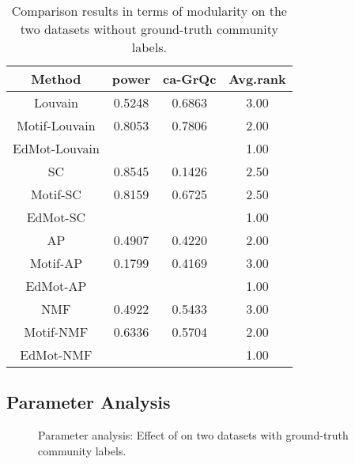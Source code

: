 \documentclass[sigconf]{acmart}
\begin{document}
\begin{table}[!t]
\caption{Comparison results in terms of modularity on the two datasets without ground-truth community labels.}
\label{table:modularity2}
\begin{center}
\vskip -0.1in
\begin{tabular}{@{}c|c|c|c@{}}
  \hline
Method  &power &ca-GrQc&Avg.rank\\
\hline
  Louvain  &0.5248\scriptsize{} & 0.6863\scriptsize{} &3.00\\
  Motif-Louvain &0.8053\scriptsize{} &0.7806\scriptsize{} &2.00\\
  EdMot-Louvain  &\scriptsize{} & \scriptsize{} &1.00\\
  \hline
  SC & 0.8545\scriptsize{}& 0.1426\scriptsize{} &2.50\\
  Motif-SC &0.8159\scriptsize{} &0.6725\scriptsize{} &2.50\\
  EdMot-SC & \scriptsize{} & \scriptsize{}&1.00 \\
  \hline
  AP  & 0.4907\scriptsize{}  &0.4220\scriptsize{} &2.00\\
  Motif-AP & 0.1799\scriptsize{}     &0.4169\scriptsize{}&3.00\\
  EdMot-AP & \scriptsize{}    &\scriptsize{} &1.00\\
  \hline
  NMF  & 0.4922\scriptsize{}    & 0.5433\scriptsize{} &3.00\\
  Motif-NMF & 0.6336\scriptsize{}    &0.5704\scriptsize{} &2.00\\
  EdMot-NMF & \scriptsize{}    & \scriptsize{} &1.00\\
  \hline
\end{tabular}
\end{center}
\end{table}














\subsection{Parameter Analysis}
\label{sec:parameter}

\begin{figure}[!t]
\vskip -0.1in
\renewcommand{\subfigcapskip}{-4pt}
\renewcommand{\subfigbottomskip}{0pt}
\centerline{
{}
{}}
\caption{Parameter analysis: Effect of  on two datasets with ground-truth community labels. } \label{fig:para1}
\vskip -0.1in
\end{figure}
\end{document}
